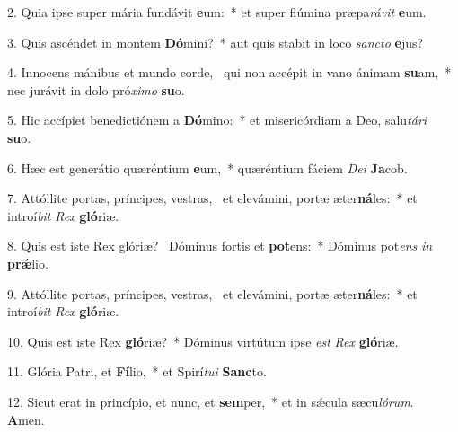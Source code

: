 2. Quia ipse super mária fundávit \textbf{e}um:~*  et super flúmina præpa\textit{rá}\textit{vit} \textbf{e}um.\

3. Quis ascéndet in montem \textbf{Dó}mini?~*  aut quis stabit in loco \textit{sanc}\textit{to} \textbf{e}jus?\

4. Innocens mánibus et mundo corde, \dag\  qui non accépit in vano ánimam \textbf{su}am,~*  nec jurávit in dolo pró\textit{xi}\textit{mo} \textbf{su}o.\

5. Hic accípiet benedictiónem a \textbf{Dó}mino:~*  et misericórdiam a Deo, salu\textit{tá}\textit{ri} \textbf{su}o.\

6. Hæc est generátio quæréntium \textbf{e}um,~*  quæréntium fáciem \textit{De}\textit{i} \textbf{Ja}cob.\

7. Attóllite portas, príncipes, vestras, \dag\  et elevámini, portæ æter\textbf{ná}les:~*  et introí\textit{bit} \textit{Rex} \textbf{gló}riæ.\

8. Quis est iste Rex glóriæ? \dag\  Dóminus fortis et \textbf{pot}ens:~*  Dóminus pot\textit{ens} \textit{in} \textbf{prǽ}lio.\

9. Attóllite portas, príncipes, vestras, \dag\  et elevámini, portæ æter\textbf{ná}les:~*  et introí\textit{bit} \textit{Rex} \textbf{gló}riæ.\

10. Quis est iste Rex \textbf{gló}riæ?~*  Dóminus virtútum ipse \textit{est} \textit{Rex} \textbf{gló}riæ.\

11. Glória Patri, et \textbf{Fí}lio,~*  et Spirí\textit{tu}\textit{i} \textbf{Sanc}to.\

12. Sicut erat in princípio, et nunc, et \textbf{sem}per,~*  et in sǽcula sæcu\textit{ló}\textit{rum}. \textbf{A}men.\

